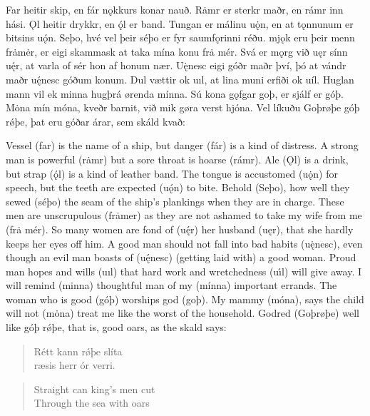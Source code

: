 \begin{paracol}{2}
    Far heitir skip, en fár nǫkkurs konar nauð. Rȧmr er sterkr maðr, en rámr inn hási. Ǫl heitir drykkr, en ǫ́l er band. Tungan er málinu uǫ̇n, en at tǫnnunum er bitsins uǫ́n. Seþo, hvé vel þeir séþo er fyr saumfǫrinni réðu. mjǫk eru þeir menn frȧmėr, er eigi skammask at taka mína konu frȧ mér. Svá er mǫrg við uęr sínn uę́r, at varla of sér hon af honum nær. Uę̇nesc eigi góðr maðr því, þó at vándr maðr uę́nesc góðum konum. Dul vættir ok uıl, at lina muni erfiði ok uíl. Huglan mann vil ek minna hugþrá ørenda mínna. Sú kona gǫfgar goþ, er sjálf er góþ. Mȯna mín móna, kveðr barnit, við mik gøra verst hjóna. Vel líkuðu Goþrøþe góþ rǿþe, þat eru góðar árar, sem skáld kvað:

    \switchcolumn

    Vessel (far) is the name of a ship, but danger (fár) is a kind of distress. A strong man is powerful (rȧmr) but a sore throat is hoarse (rámr). Ale (Ǫl) is a drink, but strap (ǫ́l) is a kind of leather band. The tongue is accustomed (u\.{ǫ}n) for speech, but the teeth are expected (u\'{ǫ}n) to bite. Behold (Seþo), how well they sewed (séþo) the seam of the ship's plankings when they are in charge. These men are unscrupulous (frȧmer) as they are not ashamed to take my wife from me (frȧ mér). So many women are fond of (uę́r) her husband (uęr), that she hardly keeps her eyes off him. A good man should not fall into bad habits (uę̇nesc), even though an evil man boasts of (uę́nesc) (getting laid with) a good woman. Proud man hopes and wills (uıl) that hard work and wretchedness (u\'{ı}l) will give away. I will remind (minna) thoughtful man of my (mínna) important errands. The woman who is good (góþ) worships god (goþ). My mammy (móna), says the child will not (mȯna) treat me like the worst of the household. Godred (Goþrøþe) well like góþ rǿþe, that is, good oars, as the skald says:

    \switchcolumn*

    \begin{quote}
        Rétt kann rǿþe slíta\\
        ræsis herr ór verri.\\
    \end{quote}

    \switchcolumn

    \begin{quote}
        Straight can king's men cut\\
        Through the sea with oars \\
    \end{quote}


\end{paracol}
